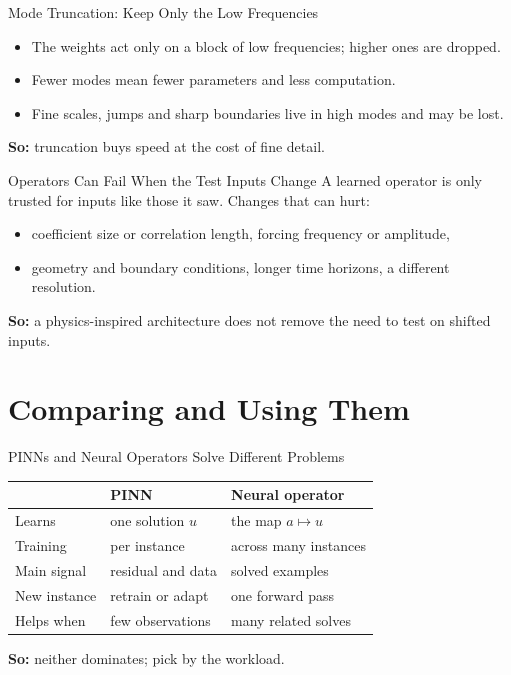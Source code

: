 \documentclass{ntuabeamer}
\begin{document}
\begin{frame}{Mode Truncation: Keep Only the Low Frequencies}
  \centering

  \raggedright
  \begin{itemize}
    \item The weights act only on a block of low frequencies; higher ones are dropped.
    \item Fewer modes mean fewer parameters and less computation.
    \item Fine scales, jumps and sharp boundaries live in high modes and may be lost.
  \end{itemize}
  \textbf{So:} truncation buys speed at the cost of fine detail.
\end{frame}

\begin{frame}{Operators Can Fail When the Test Inputs Change}
  A learned operator is only trusted for inputs like those it saw. Changes that can hurt:
  \begin{itemize}
    \item coefficient size or correlation length, forcing frequency or amplitude,
    \item geometry and boundary conditions, longer time horizons, a different resolution.
  \end{itemize}
  \textbf{So:} a physics-inspired architecture does not remove the need to test on shifted inputs.
\end{frame}

\section{Comparing and Using Them}

\begin{frame}{PINNs and Neural Operators Solve Different Problems}
  \small
  \begin{center}
  \begin{tabular}{p{2.3cm}p{3.7cm}p{3.7cm}}
    \hline
      & PINN & Neural operator\\
    \hline
    Learns & one solution \(u\) & the map \(a\mapsto u\)\\
    Training & per instance & across many instances\\
    Main signal & residual and data & solved examples\\
    New instance & retrain or adapt & one forward pass\\
    Helps when & few observations & many related solves\\
    \hline
  \end{tabular}
  \end{center}
  \normalsize
  \textbf{So:} neither dominates; pick by the workload.
\end{frame}
\end{document}
